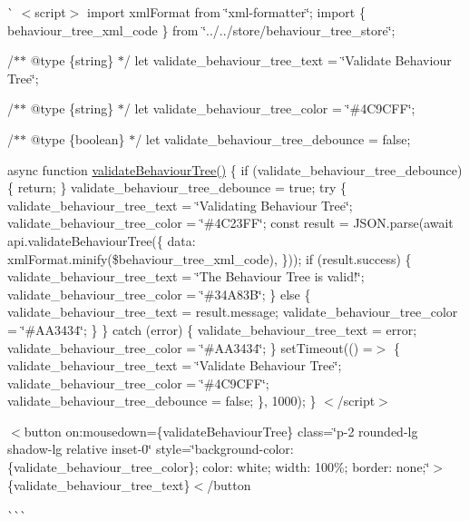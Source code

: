 \`{} $<$script$>$ import xml\+Format from \char`\"{}xml-\/formatter\char`\"{}; import \{ behaviour\+\_\+tree\+\_\+xml\+\_\+code \} from \char`\"{}../../store/behaviour\+\_\+tree\+\_\+store\char`\"{};

/$\ast$$\ast$ @type \{string\} $\ast$/ let validate\+\_\+behaviour\+\_\+tree\+\_\+text = \char`\"{}\+Validate Behaviour Tree\char`\"{};

/$\ast$$\ast$ @type \{string\} $\ast$/ let validate\+\_\+behaviour\+\_\+tree\+\_\+color = \char`\"{}\#4\+C9\+CFF\char`\"{};

/$\ast$$\ast$ @type \{boolean\} $\ast$/ let validate\+\_\+behaviour\+\_\+tree\+\_\+debounce = false;

async function \mbox{\hyperlink{behaviour__tree_8js_ae5f4d3481cf68db2c222cc1848971c14}{validate\+Behaviour\+Tree()}} \{ if (validate\+\_\+behaviour\+\_\+tree\+\_\+debounce) \{ return; \} validate\+\_\+behaviour\+\_\+tree\+\_\+debounce = true; try \{ validate\+\_\+behaviour\+\_\+tree\+\_\+text = \char`\"{}\+Validating Behaviour Tree\char`\"{}; validate\+\_\+behaviour\+\_\+tree\+\_\+color = \char`\"{}\#4\+C23\+FF\char`\"{}; const result = JSON.\+parse(await api.\+validate\+Behaviour\+Tree(\{ data\+: xml\+Format.\+minify(\$behaviour\+\_\+tree\+\_\+xml\+\_\+code), \})); if (result.\+success) \{ validate\+\_\+behaviour\+\_\+tree\+\_\+text = \char`\"{}\+The Behaviour Tree is valid!\char`\"{}; validate\+\_\+behaviour\+\_\+tree\+\_\+color = \char`\"{}\#34\+A83\+B\char`\"{}; \} else \{ validate\+\_\+behaviour\+\_\+tree\+\_\+text = result.\+message; validate\+\_\+behaviour\+\_\+tree\+\_\+color = \char`\"{}\#\+AA3434\char`\"{}; \} \} catch (error) \{ validate\+\_\+behaviour\+\_\+tree\+\_\+text = error; validate\+\_\+behaviour\+\_\+tree\+\_\+color = \char`\"{}\#\+AA3434\char`\"{}; \} set\+Timeout(() =\texorpdfstring{$>$}{>} \{ validate\+\_\+behaviour\+\_\+tree\+\_\+text = \char`\"{}\+Validate Behaviour Tree\char`\"{}; validate\+\_\+behaviour\+\_\+tree\+\_\+color = \char`\"{}\#4\+C9\+CFF\char`\"{}; validate\+\_\+behaviour\+\_\+tree\+\_\+debounce = false; \}, 1000); \} $<$/script$>$

$<$button     on\+:mousedown=\{validate\+Behaviour\+Tree\}     class=\char`\"{}p-\/2 rounded-\/lg shadow-\/lg relative inset-\/0\char`\"{}     style=\char`\"{}background-\/color\+: \{validate\+\_\+behaviour\+\_\+tree\+\_\+color\}; color\+: white; width\+: 100\%; border\+: none;\char`\"{}$>$\{validate\+\_\+behaviour\+\_\+tree\+\_\+text\}\texorpdfstring{$<$}{<}/button \begin{quote}
 \end{quote}
\`{}\`{}\`{} 